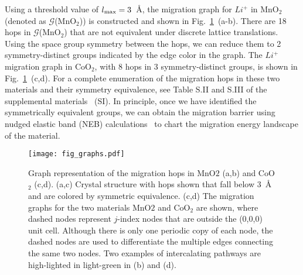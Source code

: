 \documentclass[reprint,preprintnumbers,amsmath,amssymb,aps,prl]{revtex4-1}
\newcommand{\GM}[1]{$\mathcal{G}$({#1})}
\begin{document}
Using a threshold value of $l_{\rm max} = 3$~\AA, the migration graph for $Li^{+}$ in MnO$_2$ (denoted as \GM{MnO$_2$}) is constructed and shown in Fig.~\ref{fig:graph_rep}~(a-b).
There are 18 hops in \GM{MnO$_2$} that are not equivalent under discrete lattice translations.
Using the space group symmetry between the hops, we can reduce them to 2 symmetry-distinct groups indicated by the edge color in the graph.
The $Li^{+}$ migration graph in CoO$_2$, with 8 hops in 3 symmetry-distinct groups, is shown in Fig.~\ref{fig:graph_rep}~(c,d).
For a complete enumeration of the migration hops in these two materials and their symmetry equivalence, see Table S.II and S.III of the supplemental materials~\cite{Supp} (SI).
In principle, once we have identified the symmetrically equivalent groups, we can obtain the migration barrier using nudged elastic band (NEB) calculations~\cite{Jonsson1998Jun} to chart the migration energy landscape of the material.
%
\begin{figure}[htb]
    \centering
    \texttt{[image: fig\_graphs.pdf]}
    \caption{
        \label{fig:graph_rep}
        Graph representation of the migration hops in MnO$2$ (a,b) and CoO$_2$ (c,d).
        (a,c) Crystal structure with hops shown that fall below 3~\AA{} and are colored by symmetric equivalence.
        (c,d) The migration graphs for the two materials MnO$2$ and CoO$_2$ are shown, where
        dashed nodes represent $j$-index nodes that are outside the (0,0,0) unit cell.
        Although there is only one periodic copy of each node, the dashed nodes are used to differentiate the multiple edges connecting the same two nodes.
        Two examples of intercalating pathways are high-lighted in light-green in (b) and (d).
    }
\end{figure}{}


\end{document}
